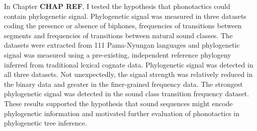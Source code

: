 In Chapter \textbf{CHAP REF}, I tested the hypothesis that phonotactics could contain phylogenetic signal. Phylogenetic signal was measured in three datasets coding the presence or absence of biphones, frequencies of transitions between segments and frequencies of transitions between natural sound classes. The datasets were extracted from 111 Pama-Nyungan languages and phylogenetic signal was measured using a pre-existing, independent reference phylogeny inferred from traditional lexical cognate data. Phylogenetic signal was detected in all three datasets. Not unexpectedly, the signal strength was relatively reduced in the binary data and greater in the finer-grained frequency data. The strongest phylogenetic signal was detected in the sound class transition frequency dataset. These results supported the hypothesis that sound sequences might encode phylogenetic information and motivated further evaluation of phonotactics in phylogenetic tree inference.

